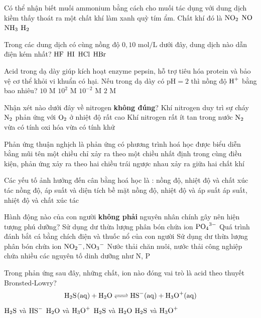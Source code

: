 \documentclass[11pt,a4paper]{article}
\begin{document}
\begin{ex}
Có thể nhận biết muối ammonium bằng cách cho muối tác dụng với dung dịch kiềm thấy thoát ra một chất khí làm xanh quỳ tím ẩm. Chất khí đó là
\choice
{$\ce{NO2}$}
{$\ce{NO}$}
{\True $\ce{NH3}$}
{$\ce{H2}$}
\end{ex}
\begin{ex}
Trong các dung dịch có cùng nồng độ $0,10\text{ mol/L}$ dưới đây, dung dịch nào dẫn điện kém nhất?
\choice
{\True $\ce{HF}$}
{$\ce{HI}$}
{$\ce{HCl}$}
{$\ce{HBr}$}
\end{ex}
\begin{ex}
Acid trong dạ dày giúp kích hoạt enzyme pepsin, hỗ trợ tiêu hóa protein và bảo vệ cơ thể khỏi vi khuẩn có hại. Nếu trong dạ dày có $\text{pH} = 2$ thì nồng độ $\ce{H+}$ bằng bao nhiêu?
\choice
{$10\text{ M}$}
{$10^2\text{ M}$}
{\True $10^{-2}\text{ M}$}
{$2\text{ M}$}
\end{ex}
\begin{ex}
Nhận xét nào dưới đây về nitrogen \textbf{không đúng}?
\choice
{\True Khí nitrogen duy trì sự cháy}
{$\ce{N2}$ phản ứng với $\ce{O2}$ ở nhiệt độ rất cao}
{Khí nitrogen rất ít tan trong nước}
{$\ce{N2}$ vừa có tính oxi hóa vừa có tính khử}
\end{ex}
\begin{ex}
Phản ứng thuận nghịch là phản ứng
\choice
{có phương trình hoá học được biểu diễn bằng mũi tên một chiều}
{chỉ xảy ra theo một chiều nhất định}
{\True trong cùng điều kiện, phản ứng xảy ra theo hai chiều trái ngược nhau}
{xảy ra giữa hai chất khí}
\end{ex}
\begin{ex}
Các yếu tố ảnh hưởng đến cân bằng hoá học là :
\choice
{nồng độ, nhiệt độ và chất xúc tác}
{nồng độ, áp suất và diện tích bề mặt}
{\True nồng độ, nhiệt độ và áp suất}
{áp suất, nhiệt độ và chất xúc tác}
\end{ex}
\begin{ex}
Hành động nào của con người \textbf{không phải} nguyên nhân chính gây nên hiện tượng phú dưỡng?
\choice
{Sử dụng dư thừa lượng phân bón chứa ion $\ce{PO4^3-}$}
{\True Quá trình đánh bắt cá bằng chích điện và thuốc nổ của con người}
{Sử dụng dư thừa lượng phân bón chứa ion $\ce{NO2^-}, \ce{NO3^-}$}
{Nước thải chăn nuôi, nước thải công nghiệp chứa nhiều các nguyên tố dinh dưỡng như N, P}
\end{ex}
\begin{ex}
Trong phản ứng sau đây, những chất, ion nào đóng vai trò là acid theo thuyết Bronsted-Lowry?
$$\ce{H2S(aq) + H2O <=> HS^-(aq) + H3O^+(aq)}$$
\choice
{$\ce{H2S}$ và $\ce{HS^-}$}
{$\ce{H2O}$ và $\ce{H3O^+}$}
{$\ce{H2S}$ và $\ce{H2O}$}
{\True $\ce{H2S}$ và $\ce{H3O^+}$}
\end{ex}
\end{document}
